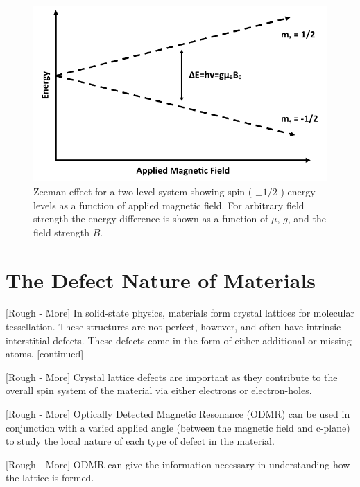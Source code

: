 \documentclass[oneside, astronomy, noacknowlegments]{BYUPhys}
\begin{document}
\begin{figure}
    \centerline{\includegraphics{zeeman_fig}}
    \caption[Zeeman effect and resonant conditions in matter]{\label{fig:Zeeman}
     Zeeman effect for a two level system showing spin ( $\pm 1/2$ ) energy levels as a function of applied magnetic field. For arbitrary field strength the energy difference is shown as a function of $\mu$, $g$, and the field strength $B$.}
\end{figure}

\section{The Defect Nature of Materials}

[Rough - More] In solid-state physics, materials form crystal lattices for molecular tessellation. These structures are not perfect, however, and often have intrinsic interstitial defects. These defects come in the form of either additional or missing atoms. [continued]

[Rough - More] Crystal lattice defects are important as they contribute to the overall spin system of the material via either electrons or electron-holes.

[Rough - More] Optically Detected Magnetic Resonance (ODMR) can be used in conjunction with a varied applied angle (between the magnetic field and c-plane) to study the local nature of each type of defect in the material.

[Rough - More] ODMR can give the information necessary in understanding how the lattice is formed.
\end{document}
